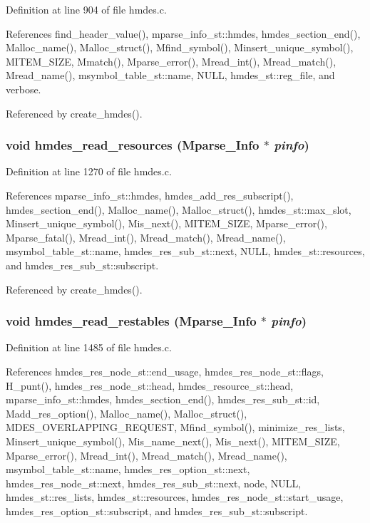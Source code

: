 Definition at line 904 of file hmdes.c.

References find\_\-header\_\-value(), mparse\_\-info\_\-st::hmdes, hmdes\_\-section\_\-end(), Malloc\_\-name(), Malloc\_\-struct(), Mfind\_\-symbol(), Minsert\_\-unique\_\-symbol(), MITEM\_\-SIZE, Mmatch(), Mparse\_\-error(), Mread\_\-int(), Mread\_\-match(), Mread\_\-name(), msymbol\_\-table\_\-st::name, NULL, hmdes\_\-st::reg\_\-file, and verbose.

Referenced by create\_\-hmdes().
\subsubsection{\setlength{\rightskip}{0pt plus 5cm}void hmdes\_\-read\_\-resources (\bf{Mparse\_\-Info} $\ast$ {\em pinfo})}\label{hmdes_8h_cd1ff0019bf0cc483c1ec95416c53450}




Definition at line 1270 of file hmdes.c.

References mparse\_\-info\_\-st::hmdes, hmdes\_\-add\_\-res\_\-subscript(), hmdes\_\-section\_\-end(), Malloc\_\-name(), Malloc\_\-struct(), hmdes\_\-st::max\_\-slot, Minsert\_\-unique\_\-symbol(), Mis\_\-next(), MITEM\_\-SIZE, Mparse\_\-error(), Mparse\_\-fatal(), Mread\_\-int(), Mread\_\-match(), Mread\_\-name(), msymbol\_\-table\_\-st::name, hmdes\_\-res\_\-sub\_\-st::next, NULL, hmdes\_\-st::resources, and hmdes\_\-res\_\-sub\_\-st::subscript.

Referenced by create\_\-hmdes().
\subsubsection{\setlength{\rightskip}{0pt plus 5cm}void hmdes\_\-read\_\-restables (\bf{Mparse\_\-Info} $\ast$ {\em pinfo})}\label{hmdes_8h_ac8add27a07c2d96cf0f917674ef99e9}




Definition at line 1485 of file hmdes.c.

References hmdes\_\-res\_\-node\_\-st::end\_\-usage, hmdes\_\-res\_\-node\_\-st::flags, H\_\-punt(), hmdes\_\-res\_\-node\_\-st::head, hmdes\_\-resource\_\-st::head, mparse\_\-info\_\-st::hmdes, hmdes\_\-section\_\-end(), hmdes\_\-res\_\-sub\_\-st::id, Madd\_\-res\_\-option(), Malloc\_\-name(), Malloc\_\-struct(), MDES\_\-OVERLAPPING\_\-REQUEST, Mfind\_\-symbol(), minimize\_\-res\_\-lists, Minsert\_\-unique\_\-symbol(), Mis\_\-name\_\-next(), Mis\_\-next(), MITEM\_\-SIZE, Mparse\_\-error(), Mread\_\-int(), Mread\_\-match(), Mread\_\-name(), msymbol\_\-table\_\-st::name, hmdes\_\-res\_\-option\_\-st::next, hmdes\_\-res\_\-node\_\-st::next, hmdes\_\-res\_\-sub\_\-st::next, node, NULL, hmdes\_\-st::res\_\-lists, hmdes\_\-st::resources, hmdes\_\-res\_\-node\_\-st::start\_\-usage, hmdes\_\-res\_\-option\_\-st::subscript, and hmdes\_\-res\_\-sub\_\-st::subscript.


